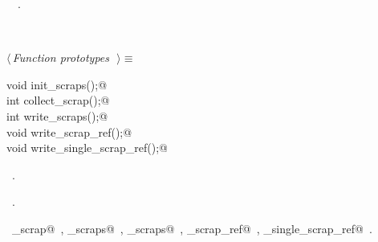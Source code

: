 \documentclass{report}
\begin{document}
\begin{flushleft}
\begin{minipage}{\linewidth}
\vspace{-2ex}
\footnotesize\addtolength{\baselineskip}{-1ex}
\begin{list}{}{\setlength{\itemsep}{-\parsep}\setlength{\itemindent}{-\leftmargin}}
\item \NWtxtIdentsUsed\nobreak\  \verb@ScrapEntry@\nobreak\ .\end{list}
\end{minipage}\\[4ex]
\end{flushleft}
\begin{flushleft} \small
\begin{minipage}{\linewidth} \label{scrap149}
$\langle\,${\it Function prototypes}\nobreak\ {\footnotesize {}}$\,\rangle\equiv$
\vspace{-1ex}
\begin{list}{}{} \item
\mbox{}\verb@extern void init_scraps();@\\
\mbox{}\verb@extern int collect_scrap();@\\
\mbox{}\verb@extern int write_scraps();@\\
\mbox{}\verb@extern void write_scrap_ref();@\\
\mbox{}\verb@extern void write_single_scrap_ref();@\\
\mbox{}\verb@@{\NWsep}
\end{list}
\vspace{-1ex}
\footnotesize\addtolength{\baselineskip}{-1ex}
\begin{list}{}{\setlength{\itemsep}{-\parsep}\setlength{\itemindent}{-\leftmargin}}
\item \NWtxtMacroDefBy\ .
\item \NWtxtMacroRefIn\ .
\end{list}
\vspace{-2ex}
\footnotesize\addtolength{\baselineskip}{-1ex}
\begin{list}{}{\setlength{\itemsep}{-\parsep}\setlength{\itemindent}{-\leftmargin}}
\item \NWtxtIdentsUsed\nobreak\  \verb@collect_scrap@\nobreak\ , \verb@init_scraps@\nobreak\ , \verb@write_scraps@\nobreak\ , \verb@write_scrap_ref@\nobreak\ , \verb@write_single_scrap_ref@\nobreak\ .\end{list}
\end{minipage}\\[4ex]
\end{flushleft}
\end{document}
